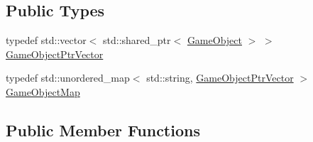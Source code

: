 \subsection*{Public Types}
\begin{DoxyCompactItemize}
\item 
typedef std\+::vector$<$ std\+::shared\+\_\+ptr$<$ \hyperlink{class_game_object}{Game\+Object} $>$ $>$ \hyperlink{class_abductor_a2fc54e0ab08037996dd212d4d2d0443f}{Game\+Object\+Ptr\+Vector}
\item 
typedef std\+::unordered\+\_\+map$<$ std\+::string, \hyperlink{class_abductor_a2fc54e0ab08037996dd212d4d2d0443f}{Game\+Object\+Ptr\+Vector} $>$ \hyperlink{class_abductor_a15ce0d62a23ac0c3e335874ff4286f5f}{Game\+Object\+Map}
\end{DoxyCompactItemize}
\subsection*{Public Member Functions}
